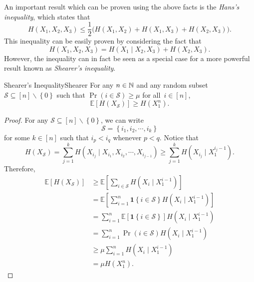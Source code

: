 \documentclass[math]{amznotes}
\theoremstyle{remark}
\begin{document}
An important result which can be proven using the above facts is the \textit{Hans's inequality}, which states that 
\begin{equation*}
    H\left(X_1, X_2, X_3\right) \leq \frac{1}{2}\bigl(H\left(X_1, X_2\right) + H\left(X_1, X_3\right) + H\left(X_2, X_3\right)\bigr).
\end{equation*}
This inequality can be easily proven by considering the fact that 
\begin{equation*}
    H\left(X_1, X_2, X_3\right) = H\left(X_1 \mid X_2, X_3\right) + H\left(X_2, X_3\right).
\end{equation*}
However, the inequality can in fact be seen as a special case for a more powerful result known as \textit{Shearer's inequality}.
\begin{thmbox}{Shearer's Inequality}{Shearer}
    For any $n \in \mathbb{N}$ and any random subset $\mathcal{S} \subseteq \left[n\right] \backslash \left\{0\right\}$ such that $\Pr\left(i \in \mathcal{S}\right) \geq \mu$ for all~$i \in \left[n\right]$, 
    \begin{equation*}
        \mathbb{E}\left[H\left(X_{\mathcal{S}}\right)\right] \geq H\left(X_1^n\right).
    \end{equation*} 
    \tcblower
    \begin{proof}
        For any $\mathcal{S} \subseteq \left[n\right] \backslash \left\{0\right\}$, we can write 
        \begin{equation*}
            \mathcal{S} = \left\{i_1, i_2, \cdots, i_k\right\}
        \end{equation*}
        for some $k \in \left[n\right]$ such that $i_p < i_q$ whenever $p < q$. Notice that 
        \begin{equation*}
            H\left(X_{\mathcal{S}}\right) = \sum_{j = 1}^{k}H\left(X_{i_j} \mid X_{i_1}, X_{i_2}, \cdots, X_{i_{j - 1}}\right) \geq \sum_{j = 1}^{k}H\left(X_{i_j} \mid X_1^{i_j - 1}\right).
        \end{equation*}
        Therefore,
        \begin{align*}
            \mathbb{E}\left[H\left(X_{\mathcal{S}}\right)\right] & \geq \mathbb{E}\left[\sum_{i \in \mathcal{S}}H\left(X_{i} \mid X_1^{i - 1}\right)\right] \\
            & = \mathbb{E}\left[\sum_{i = 1}^{n}\mathbf{1}\left\{i \in \mathcal{S}\right\}H\left(X_{i} \mid X_1^{i - 1}\right)\right] \\
            & = \sum_{i = 1}^{n}\mathbb{E}\left[\mathbf{1}\left\{i \in \mathcal{S}\right\}\right]H\left(X_{i} \mid X_1^{i - 1}\right) \\
            & = \sum_{i = 1}^{n}\Pr\left(i \in \mathcal{S}\right)H\left(X_{i} \mid X_1^{i - 1}\right) \\
            & \geq \mu\sum_{i = 1}^{n}H\left(X_{i} \mid X_1^{i - 1}\right) \\
            & = \mu H\left(X_1^n\right).
        \end{align*}
    \end{proof}
\end{thmbox}
\end{document}
